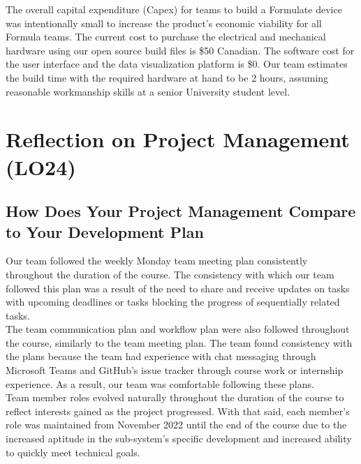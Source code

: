 \documentclass{article}
\begin{document}
The overall capital expenditure (Capex) for teams to build a Formulate device was intentionally small to increase the product's economic viability for all Formula teams. The current cost to purchase the electrical and mechanical hardware using our open source build files is \$50 Canadian. The software cost for the user interface and the data visualization platform is \$0. Our team estimates the build time with the required hardware at hand to be 2 hours, assuming reasonable workmanship skills at a senior University student level. \\



\section{Reflection on Project Management (LO24)}


\subsection{How Does Your Project Management Compare to Your Development Plan}


Our team followed the weekly Monday team meeting plan consistently throughout the duration of the course. The consistency with which our team followed this plan was a result of the need to share and receive updates on tasks with upcoming deadlines or tasks blocking the progress of sequentially related tasks. \\

The team communication plan and workflow plan were also followed throughout the course, similarly to the team meeting plan. The team found consistency with the plans because the team had experience with chat messaging through Microsoft Teams and GitHub's issue tracker through course work or internship experience. As a result, our team was comfortable following these plans. \\

Team member roles evolved naturally throughout the duration of the course to reflect interests gained as the project progressed. With that said, each member's role was maintained from November 2022 until the end of the course due to the increased aptitude in the sub-system's specific development and increased ability to quickly meet technical goals. \\
\end{document}
